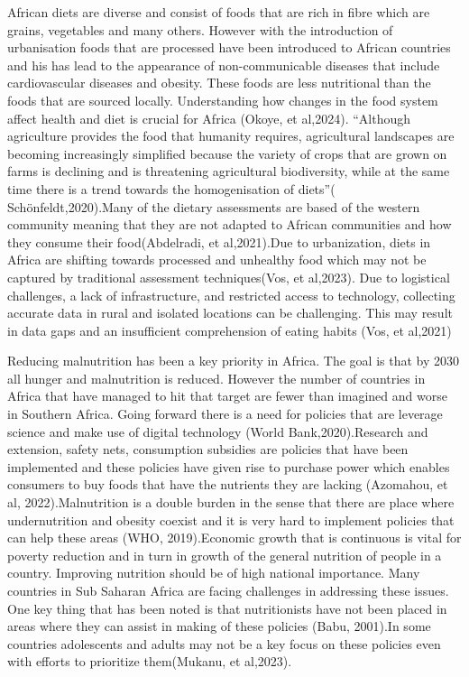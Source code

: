 \documentclass[a4paper,11pt]{report}
\begin{document}
African diets are diverse and consist of foods that are rich in fibre which are grains, vegetables and many others. However with the introduction of urbanisation foods that are processed have been introduced to African countries and his has lead to the appearance of non-communicable diseases that include cardiovascular diseases and obesity. These foods are less nutritional than the foods that are sourced locally. Understanding how changes in the food system affect health and diet is crucial for Africa (Okoye, et al,2024). “Although agriculture provides the food that humanity requires, agricultural landscapes are becoming increasingly simplified because the variety of crops that are grown on farms is declining and is threatening agricultural biodiversity, while at the same time there is a trend towards the homogenisation of diets”( Schönfeldt,2020).Many of the dietary assessments are based of the western community meaning that they are not adapted to African communities and how they consume their food(Abdelradi, et al,2021).Due to urbanization, diets in Africa are shifting towards processed and unhealthy food which may not be captured by traditional assessment techniques(Vos, et al,2023). Due to logistical challenges, a lack of infrastructure, and restricted access to technology, collecting accurate data in rural and isolated locations can be challenging. This may result in data gaps and an insufficient comprehension of eating habits (Vos, et al,2021)\par
	Reducing malnutrition has been a key priority in Africa. The goal is that by 2030 all hunger and malnutrition is reduced. However the number of countries in Africa that have managed to hit that target are fewer than imagined and worse in Southern Africa. Going forward there is a need for policies that are leverage science and make use of digital technology (World Bank,2020).Research and extension, safety nets, consumption subsidies are policies that have been implemented and these policies have given rise to purchase power which enables consumers to buy foods that have the nutrients they are lacking (Azomahou, et al, 2022).Malnutrition is a double burden in the sense that there are place where undernutrition and obesity coexist and it is very hard to implement policies that can help these areas (WHO, 2019).Economic growth that is continuous is vital for poverty reduction and in turn in growth of the general nutrition of people in a country. Improving nutrition should be of high national importance. Many countries in Sub Saharan Africa are facing challenges in addressing these issues. One key thing that has been noted is that nutritionists have not been placed in areas where they can assist in making of these policies (Babu, 2001).In some countries adolescents and adults may not be a key focus on these policies even with efforts to prioritize them(Mukanu, et al,2023).\par
\end{document}
